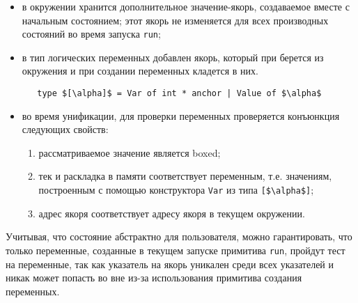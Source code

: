 \begin{itemize}
\item в окружении хранится дополнительное значение-якорь, создаваемое вместе с начальным состоянием; этот якорь не изменяется для всех производных состояний во время запуска \lstinline=run=;
\item  в тип логических переменных добавлен якорь, который при берется из окружения и при создании переменных кладется в них.

\begin{lstlisting}
   type $[\alpha]$ = Var of int * anchor | Value of $\alpha$
\end{lstlisting}


\item во время унификации, для проверки переменных проверяется конъюнкция следующих свойств:

  \begin{enumerate}
    \item рассматриваемое значение является boxed;
    \item тек и раскладка в памяти соответствует переменным, т.е. значениям, построенным с помощью конструктора \lstinline|Var| из типа \lstinline{[$\alpha$]};
    \item адрес якоря соответствует адресу якоря в текущем окружении.
  \end{enumerate}
\end{itemize}

Учитывая, что состояние абстрактно для пользователя, можно гарантировать, что только переменные, созданные в текущем запуске примитива \lstinline=run=, пройдут тест на переменные, так как указатель на якорь уникален среди всех указателей и никак может попасть во вне из-за использования примитива создания переменных.

